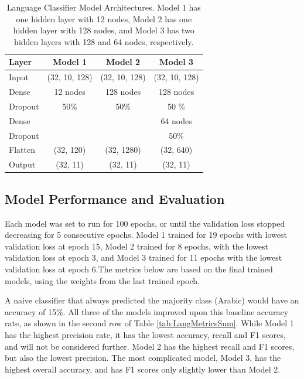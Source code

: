 \begin{table}[!h]
\begin{center}
\caption{Language Classifier Model Architectures. Model 1 has one hidden layer with 12 nodes, Model 2 has one hidden layer with 128 nodes, and Model 3 has two hidden layers with 128 and 64 nodes, respectively.}
\begin{tabular}{l | c |c  | c |}

Layer  & Model 1 & Model 2 & Model 3\\
\hline

Input 	& (32, 10, 128)& (32, 10, 128) & (32, 10, 128) \\ \hline

Dense	& 12 nodes 	& 128 nodes 	& 128 nodes \\
Dropout	& 50\%		& 50\%		& 50 \% \\ \hline

Dense	&			&			& 64 nodes \\
Dropout	&			& 			& 50\% \\ \hline

Flatten 	& (32, 120)	& (32, 1280)	& (32, 640) \\ \hline
Output 	& (32, 11)		& (32, 11)		& (32, 11)\\
\hline
\end{tabular}

\label{tab:LangModels}
\end{center}
\end{table}

\subsection{Model Performance and Evaluation}

Each model was set to run for 100 epochs, or until the validation loss stopped decreasing for 5 consecutive epochs. Model 1 trained for 19 epochs with lowest validation loss at epoch 15, Model 2 trained for 8 epochs, with the lowest validation loss at epoch 3, and Model 3 trained for 11 epochs with the lowest validation loss at epoch 6.The metrics below are based on the final trained models, using the weights from the last trained epoch.

A naive classifier that always predicted the majority class (Arabic) would have an accuracy of 15\%.  All three of the models improved upon this baseline accuracy rate, as shown in the second row of Table \ref{tab:LangMetricsSum}. While Model 1 has the highest precision rate, it has the lowest accuracy, recall and F1 scores, and will not be considered further. Model 2 has the highest recall and F1 scores, but also the lowest precision. The most complicated model, Model 3, has the highest overall accuracy, and has F1 scores only slightly lower than Model 2. 

